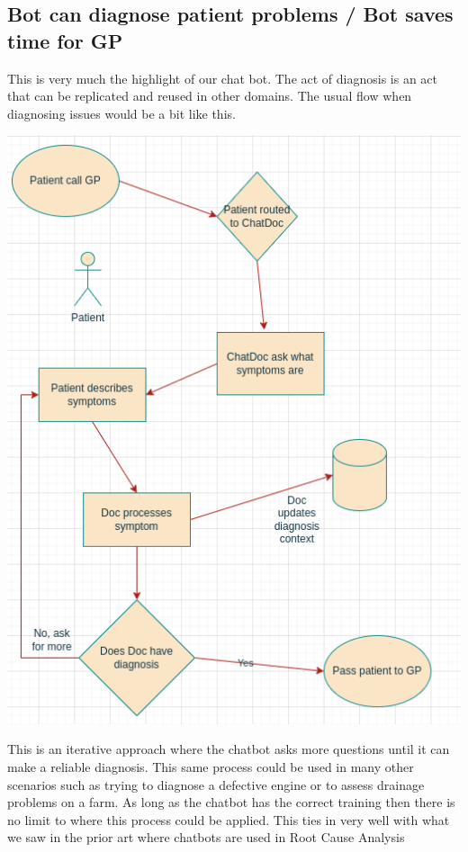 \documentclass{article}
\begin{document}
\subsection{Bot can diagnose patient problems / Bot saves time for GP} \label{diagnose}

This is very much the highlight of our chat bot. The act of diagnosis is an act that can be replicated and reused in other domains. 
The usual flow when diagnosing issues would be a bit like this.
\begin{center} 
\includegraphics[scale=0.5]{PatientFlow}
\end{center}
This is an iterative approach where the chatbot asks more questions until it can make a reliable diagnosis. This same process could be used in many other scenarios such as trying to diagnose a defective engine or to assess drainage problems on a farm. As long as the chatbot has the correct training then there is no limit to where this process could be applied. This ties in very well with what we saw in the prior art where chatbots are used in Root Cause Analysis\cite{gyan}\cite{devops}
\end{document}
